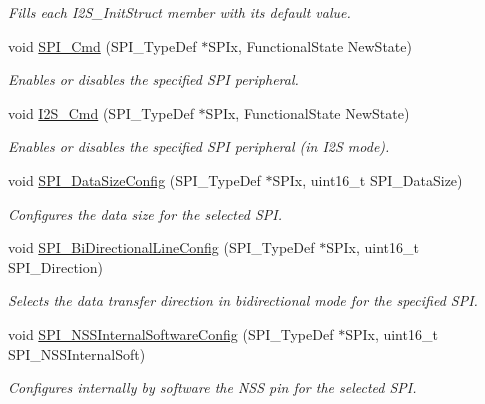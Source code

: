 \begin{DoxyCompactItemize}
\begin{DoxyCompactList}\small\item\em Fills each I2\+S\+\_\+\+Init\+Struct member with its default value. \end{DoxyCompactList}\item 
void \mbox{\hyperlink{group___s_p_i_gaa31357879a65ee1ed7223f3b9114dcf3}{S\+P\+I\+\_\+\+Cmd}} (S\+P\+I\+\_\+\+Type\+Def $\ast$S\+P\+Ix, Functional\+State New\+State)
\begin{DoxyCompactList}\small\item\em Enables or disables the specified S\+PI peripheral. \end{DoxyCompactList}\item 
void \mbox{\hyperlink{group___s_p_i_gafe061c71bbc5b4224f3f2884dc53739e}{I2\+S\+\_\+\+Cmd}} (S\+P\+I\+\_\+\+Type\+Def $\ast$S\+P\+Ix, Functional\+State New\+State)
\begin{DoxyCompactList}\small\item\em Enables or disables the specified S\+PI peripheral (in I2S mode). \end{DoxyCompactList}\item 
void \mbox{\hyperlink{group___s_p_i_gafc82e90841d7879535d655c035709cb1}{S\+P\+I\+\_\+\+Data\+Size\+Config}} (S\+P\+I\+\_\+\+Type\+Def $\ast$S\+P\+Ix, uint16\+\_\+t S\+P\+I\+\_\+\+Data\+Size)
\begin{DoxyCompactList}\small\item\em Configures the data size for the selected S\+PI. \end{DoxyCompactList}\item 
void \mbox{\hyperlink{group___s_p_i_ga166171c421fc51da7714723524d41b45}{S\+P\+I\+\_\+\+Bi\+Directional\+Line\+Config}} (S\+P\+I\+\_\+\+Type\+Def $\ast$S\+P\+Ix, uint16\+\_\+t S\+P\+I\+\_\+\+Direction)
\begin{DoxyCompactList}\small\item\em Selects the data transfer direction in bidirectional mode for the specified S\+PI. \end{DoxyCompactList}\item 
void \mbox{\hyperlink{group___s_p_i_ga56fc508a482f032f9eb80e4c63184126}{S\+P\+I\+\_\+\+N\+S\+S\+Internal\+Software\+Config}} (S\+P\+I\+\_\+\+Type\+Def $\ast$S\+P\+Ix, uint16\+\_\+t S\+P\+I\+\_\+\+N\+S\+S\+Internal\+Soft)
\begin{DoxyCompactList}\small\item\em Configures internally by software the N\+SS pin for the selected S\+PI. \end{DoxyCompactList}\item 

\end{DoxyCompactItemize}
